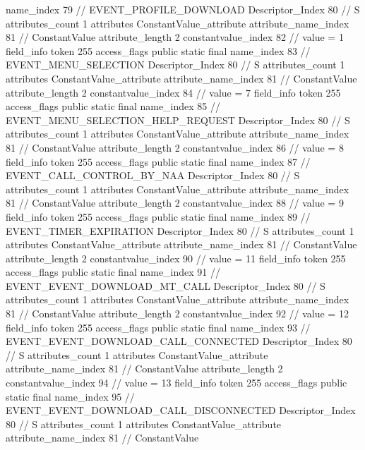 {{{{{				name_index	79		// EVENT_PROFILE_DOWNLOAD
				Descriptor_Index	80		// S
				attributes_count	1
				attributes {
				ConstantValue_attribute {
					attribute_name_index	81		// ConstantValue
					attribute_length	2
					constantvalue_index	82		// value = 1
				}
				}
			}
			field_info {
				token	255
				access_flags	public static final
				name_index	83		// EVENT_MENU_SELECTION
				Descriptor_Index	80		// S
				attributes_count	1
				attributes {
				ConstantValue_attribute {
					attribute_name_index	81		// ConstantValue
					attribute_length	2
					constantvalue_index	84		// value = 7
				}
				}
			}
			field_info {
				token	255
				access_flags	public static final
				name_index	85		// EVENT_MENU_SELECTION_HELP_REQUEST
				Descriptor_Index	80		// S
				attributes_count	1
				attributes {
				ConstantValue_attribute {
					attribute_name_index	81		// ConstantValue
					attribute_length	2
					constantvalue_index	86		// value = 8
				}
				}
			}
			field_info {
				token	255
				access_flags	public static final
				name_index	87		// EVENT_CALL_CONTROL_BY_NAA
				Descriptor_Index	80		// S
				attributes_count	1
				attributes {
				ConstantValue_attribute {
					attribute_name_index	81		// ConstantValue
					attribute_length	2
					constantvalue_index	88		// value = 9
				}
				}
			}
			field_info {
				token	255
				access_flags	public static final
				name_index	89		// EVENT_TIMER_EXPIRATION
				Descriptor_Index	80		// S
				attributes_count	1
				attributes {
				ConstantValue_attribute {
					attribute_name_index	81		// ConstantValue
					attribute_length	2
					constantvalue_index	90		// value = 11
				}
				}
			}
			field_info {
				token	255
				access_flags	public static final
				name_index	91		// EVENT_EVENT_DOWNLOAD_MT_CALL
				Descriptor_Index	80		// S
				attributes_count	1
				attributes {
				ConstantValue_attribute {
					attribute_name_index	81		// ConstantValue
					attribute_length	2
					constantvalue_index	92		// value = 12
				}
				}
			}
			field_info {
				token	255
				access_flags	public static final
				name_index	93		// EVENT_EVENT_DOWNLOAD_CALL_CONNECTED
				Descriptor_Index	80		// S
				attributes_count	1
				attributes {
				ConstantValue_attribute {
					attribute_name_index	81		// ConstantValue
					attribute_length	2
					constantvalue_index	94		// value = 13
				}
				}
			}
			field_info {
				token	255
				access_flags	public static final
				name_index	95		// EVENT_EVENT_DOWNLOAD_CALL_DISCONNECTED
				Descriptor_Index	80		// S
				attributes_count	1
				attributes {
				ConstantValue_attribute {
					attribute_name_index	81		// ConstantValue
}}}}}}}
